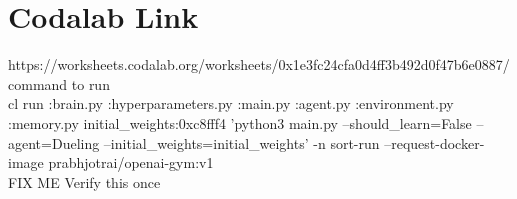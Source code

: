 \section{Codalab Link}
\label{sec:conclusion}

https://worksheets.codalab.org/worksheets/0x1e3fc24cfa0d4ff3b492d0f47b6e0887/
 \\
command to run \\

cl run :brain.py :hyperparameters.py :main.py :agent.py :environment.py :memory.py initial_weights:0xc8fff4 'python3 main.py --should_learn=False --agent=Dueling --initial_weights=initial_weights' -n sort-run --request-docker-image prabhjotrai/openai-gym:v1 \\
FIX ME Verify this once  \\